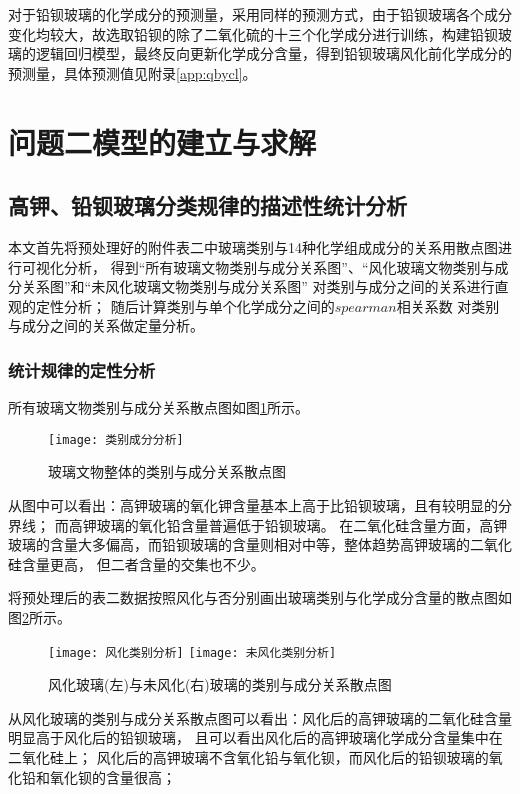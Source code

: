 \documentclass[withoutpreface,bwprint]{cumcmthesis} %
\begin{document}
对于铅钡玻璃的化学成分的预测量，采用同样的预测方式，由于铅钡玻璃各个成分变化均较大，故选取铅钡的除了二氧化硫的十三个化学成分进行训练，构建铅钡玻璃的逻辑回归模型，最终反向更新化学成分含量，得到铅钡玻璃风化前化学成分的预测量，具体预测值见附录\ref{app:qbycl}。


\section{问题二模型的建立与求解}
\subsection{高钾、铅钡玻璃分类规律的描述性统计分析}

本文首先将预处理好的附件表二中玻璃类别与14种化学组成成分的关系用散点图进行可视化分析， 得到“所有玻璃文物类别与成分关系图”、“风化玻璃文物类别与成分关系图”和“未风化玻璃文物类别与成分关系图” 对类别与成分之间的关系进行直观的定性分析； 随后计算类别与单个化学成分之间的$spearman$相关系数 对类别与成分之间的关系做定量分析。

\subsubsection{统计规律的定性分析}
所有玻璃文物类别与成分关系散点图如图\ref{ztgx}所示。

\begin{figure}[!h]
	\centering
	\texttt{[image: 类别成分分析]}
	\caption{玻璃文物整体的类别与成分关系散点图}
	\label{ztgx}
\end{figure}

从图中可以看出：高钾玻璃的氧化钾含量基本上高于比铅钡玻璃，且有较明显的分界线； 而高钾玻璃的氧化铅含量普遍低于铅钡玻璃。 在二氧化硅含量方面，高钾玻璃的含量大多偏高，而铅钡玻璃的含量则相对中等，整体趋势高钾玻璃的二氧化硅含量更高， 但二者含量的交集也不少。


将预处理后的表二数据按照风化与否分别画出玻璃类别与化学成分含量的散点图如图\ref{fhgx}所示。

\begin{figure}[!h]
	\centering
	\texttt{[image: 风化类别分析]}
	\texttt{[image: 未风化类别分析]}
	\caption{风化玻璃(左)与未风化(右)玻璃的类别与成分关系散点图}
	\label{fhgx}
\end{figure}


从风化玻璃的类别与成分关系散点图可以看出：风化后的高钾玻璃的二氧化硅含量明显高于风化后的铅钡玻璃， 且可以看出风化后的高钾玻璃化学成分含量集中在二氧化硅上； 风化后的高钾玻璃不含氧化铅与氧化钡，而风化后的铅钡玻璃的氧化铅和氧化钡的含量很高；
\end{document}
